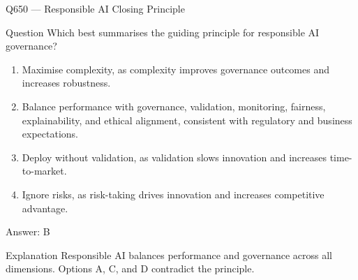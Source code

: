 \documentclass[aspectratio=169,8pt]{beamer}
\begin{document}
	\begin{frame}{Q650 --- Responsible AI Closing Principle}
		\begin{block}{Question}
			Which best summarises the guiding principle for responsible AI governance?
			\begin{enumerate}
				\item Maximise complexity, as complexity improves governance outcomes and increases robustness.
				\item Balance performance with governance, validation, monitoring, fairness, explainability, and ethical alignment, consistent with regulatory and business expectations.
				\item Deploy without validation, as validation slows innovation and increases time-to-market.
				\item Ignore risks, as risk-taking drives innovation and increases competitive advantage.
			\end{enumerate}
		\end{block}
		\begin{exampleblock}{Answer: B}\end{exampleblock}
		\begin{block}{Explanation}
			Responsible AI balances performance and governance across all dimensions. Options A, C, and D contradict the principle.
		\end{block}
	\end{frame}
	
\end{document}
